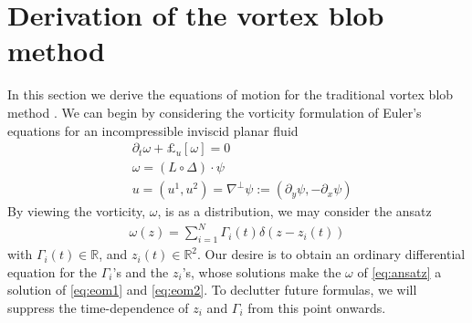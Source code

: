 \documentclass[12pt]{amsart}
\begin{document}
\section{Derivation of the vortex blob method}
\label{sec:vortex_blob}
In this section we derive the equations of motion for the traditional
vortex blob method .
We can begin by considering the vorticity formulation of Euler's equations for an incompressible inviscid planar fluid
\begin{align}
  &\partial_t \omega + \pounds_u[ \omega] = 0 \label{eq:eom1} \\
  &\omega = (L \circ \Delta) \cdot \psi \label{eq:eom2} \\
  &u = (u^1,u^2) = \nabla^\perp \psi :=  ( \partial_y \psi, - \partial_x \psi)
  \label{eq:eom3}
\end{align}
By viewing the vorticity, $\omega$, is as a distribution,
we may consider the ansatz
\begin{align}
  \omega(z) = \sum_{i=1}^N \Gamma_i(t) \delta(z-z_i(t))
  \label{eq:ansatz}
\end{align} 
with $\Gamma_i(t) \in \mathbb{R}$,
and $z_i(t) \in \mathbb{R}^2$.
Our desire is to obtain an ordinary differential equation for the $\Gamma_i$'s and the $z_i$'s,
whose solutions make the $\omega$ of \eqref{eq:ansatz} a solution of \eqref{eq:eom1} and \eqref{eq:eom2}.
To declutter future formulas,
we will suppress the time-dependence of $z_i$ and $\Gamma_i$
from this point onwards.
\end{document}
